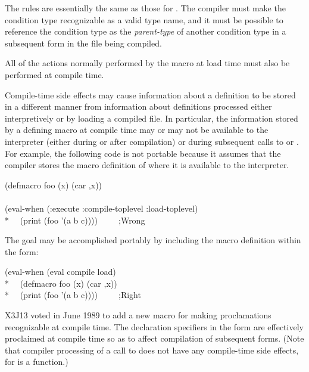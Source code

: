 \begin{newer}
\begin{flushdesc}
\item[\cd{define-condition}]
The rules are essentially the same as those for
    . The compiler must make the condition type recognizable as a
    valid type name, and it must be possible to reference the condition
    type as the {\it parent-type} of another condition type in a subsequent
     form in the file being compiled.

\item[\cd{defpackage}]
 All of the actions normally performed by the  macro at load
    time must also be performed at compile time.
\end{flushdesc}

Compile-time side effects may cause information about a
    definition to be stored in a different manner from
information about definitions
    processed either interpretively or by loading
    a compiled file.
    In particular, the information stored by a defining macro at
    compile time may or may not be available to the interpreter (either
    during or after compilation) or during subsequent calls to  or
    .  For example, the following code is not portable because
    it assumes that the compiler stores the macro definition of  where
    it is available to the interpreter.
\begin{lisp}
(defmacro foo (x) {\Xbq}(car ,x)) \\
\\
(eval-when (:execute :compile-toplevel :load-toplevel) \\*
~~(print (foo '(a b c))))~~~~~;{\rm Wrong}
\end{lisp}
    The goal may be accomplished portably by including the macro
    definition within the  form:
\begin{lisp}  
(eval-when (eval compile load) \\*
~~(defmacro foo (x) {\Xbq}(car ,x)) \\*
~~(print (foo '(a b c))))~~~~~;{\rm Right}
\end{lisp}

\begin{flushdesc}
\item[\cd{declaim}]

X3J13 voted in June 1989 
to add a new macro  for making proclamations recognizable
at compile time.  The declaration specifiers in the  form
are effectively proclaimed at compile time so as to affect
compilation of subsequent forms.  (Note that compiler processing
of a call to 
does not have any compile-time side effects, for 
is a function.)
\end{flushdesc}


\end{newer}
